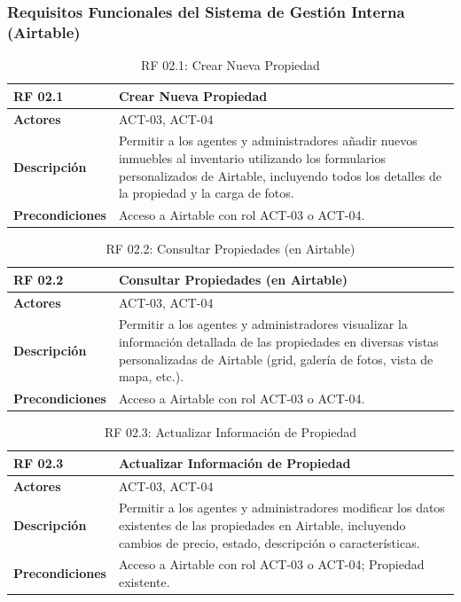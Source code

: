 \subsubsection{Requisitos Funcionales del Sistema de Gestión Interna (Airtable)}

\begin{table}[H]
    \centering
    \begin{tabular}{|p{3cm}|p{10cm}|}
    \hline
        \rowcolor{tealblue}
        \textbf{RF 02.1} & \textbf{Crear Nueva Propiedad} \\
    \hline
        \textbf{Actores} & ACT-03, ACT-04 \\
    \hline
        \textbf{Descripción} & Permitir a los agentes y administradores añadir nuevos inmuebles al inventario utilizando los formularios personalizados de Airtable, incluyendo todos los detalles de la propiedad y la carga de fotos. \\
    \hline
        \textbf{Precondiciones} & Acceso a Airtable con rol ACT-03 o ACT-04. \\
    \hline
    \end{tabular}
        \caption{RF 02.1: Crear Nueva Propiedad}
        \label{tab:rf_airtable_2_1}
\end{table}

\begin{table}[H]
\centering
\begin{tabular}{|p{3cm}|p{10cm}|}
\hline
\rowcolor{tealblue}
\textbf{RF 02.2} & \textbf{Consultar Propiedades (en Airtable)} \\
\hline
\textbf{Actores} & ACT-03, ACT-04 \\
\hline
\textbf{Descripción} & Permitir a los agentes y administradores visualizar la información detallada de las propiedades en diversas vistas personalizadas de Airtable (grid, galería de fotos, vista de mapa, etc.). \\
\hline
\textbf{Precondiciones} & Acceso a Airtable con rol ACT-03 o ACT-04. \\
\hline
\end{tabular}
\caption{RF 02.2: Consultar Propiedades (en Airtable)}
\label{tab:rf_airtable_2_2}
\end{table}

\begin{table}[H]
\centering
\begin{tabular}{|p{3cm}|p{10cm}|}
\hline
\rowcolor{tealblue}
\textbf{RF 02.3} & \textbf{Actualizar Información de Propiedad} \\
\hline
\textbf{Actores} & ACT-03, ACT-04 \\
\hline
\textbf{Descripción} & Permitir a los agentes y administradores modificar los datos existentes de las propiedades en Airtable, incluyendo cambios de precio, estado, descripción o características. \\
\hline
\textbf{Precondiciones} & Acceso a Airtable con rol ACT-03 o ACT-04; Propiedad existente. \\
\hline
\end{tabular}
\caption{RF 02.3: Actualizar Información de Propiedad}
\label{tab:rf_airtable_2_3}
\end{table}

